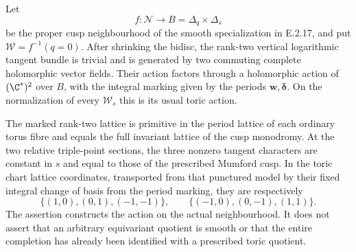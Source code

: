 \begin{proposition}
Let
\[
 f:\mathcal N\longrightarrow
 B=\Delta_q\times\Delta_s
\]
be the proper cusp neighbourhood of the smooth
specialization in E.2.17, and put
$\mathcal W=f^{-1}(q=0)$.  After shrinking the
bidisc, the rank-two vertical logarithmic tangent
bundle is trivial and is generated by two commuting
complete holomorphic vector fields.  Their action
factors through a holomorphic action of
$(\C^*)^2$ over $B$, with the integral marking
given by the periods $\mathbf w,\boldsymbol\delta$.
On the normalization of every $\mathcal W_s$
this is its usual toric action.

The marked rank-two lattice is primitive in the
period lattice of each ordinary torus fibre and
equals the full invariant lattice of the cusp
monodromy.  At the two relative triple-point
sections, the three nonzero tangent characters
are constant in $s$ and equal to those of the
prescribed Mumford cusp.  In the toric chart
lattice coordinates, transported from that
punctured model by their fixed integral change
of basis from the period marking, they are
respectively
\[
 \{(1,0),(0,1),(-1,-1)\},\qquad
 \{(-1,0),(0,-1),(1,1)\}.
 \tag{E.2.19.1}
\]
The assertion constructs the action on the actual
neighbourhood.  It does not assert that an
arbitrary equivariant quotient is smooth or
that the entire completion has already been
identified with a prescribed toric quotient.
\end{proposition}
